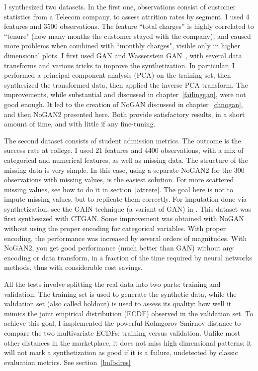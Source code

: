 \documentclass[oneside,10pt]{book}
\begin{document}
I synthesized two datasets. In the first one, observations consist of customer statistics from a Telecom company, to assess attrition rates by segment.
I used 4 features and 3500 observations. The feature ``total charges'' is highly correlated to ``tenure" (how many months the
 customer stayed with the company), and caused more problems when combined with ``monthly charges", visible only in higher dimensional plots. I first used GAN
 and Wasserstein GAN~\cite{ieeewgan}, with several data transforms and various tricks to improve the synthetization. In particular,
 I performed a \textcolor{index}{principal component analysis} (PCA) on the training set, then synthesized the transformed data, then applied the inverse PCA transform. The improvements, while substantial and discussed in chapter~\ref{failinggan}, were not
 good enough. It led to the creation of NoGAN discussed in chapter~\ref{chnogan}, and then NoGAN2 presented here. Both provide satisfactory results, in a short amount of time, and with little if any fine-tuning.

The second dataset consists of student admission metrics. The outcome is the success rate at college. I used 21 features and 4400 observations, with a mix of categorical and numerical features, as well as missing data. The structure of the missing data is very simple. In this case, using a separate NoGAN2 for the 300 observations with missing values, is the easiest solution. For more scattered missing values, see how to do it in section~\ref{attrere}.
 The goal here is not to impute missing values, but to replicate them correctly. For \textcolor{index}{imputation} done via synthetization, see the GAIN technique (a variant of GAN) in \cite{impugain}.  This dataset was first synthesized with CTGAN. Some
 improvement was obtained with NoGAN without  using the proper encoding for categorical variables. With proper encoding, the performance was increased by several orders of magnitudes. With NoGAN2, you get good performance (much better than GAN) without any encoding or data transform, in a fraction of the time required by neural networks methods, thus with considerable cost savings.

All the tests involve splitting the real data into two parts: training and validation. The training set is used to generate the synthetic data, while the \textcolor{index}{validation set} (also called \textcolor{index}{holdout}) is used to assess its quality: how well it mimics the
\textcolor{index}{joint empirical distribution} (ECDF) observed in the validation set. To achieve this goal, I
 implemented the powerful \textcolor{index}{Kolmgorov-Smirnov distance} to compare the two multivariate ECDFs: training versus validation. Unlike most other distances in the marketplace, it does not miss high dimensional patterns; it will
 not mark a synthetization as good if it is a failure, undetected by classic evaluation metrics. See section~\ref{bulbdres}
\end{document}
